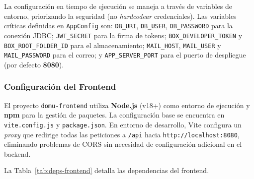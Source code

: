 La configuración en tiempo de ejecución se maneja a través de variables de entorno, priorizando la seguridad (no \textit{hardcodear} credenciales). Las variables críticas definidas en \texttt{AppConfig} son: \texttt{DB\_URI}, \texttt{DB\_USER}, \texttt{DB\_PASSWORD} para la conexión JDBC; \texttt{JWT\_SECRET} para la firma de tokens; \texttt{BOX\_DEVELOPER\_TOKEN} y \texttt{BOX\_ROOT\_FOLDER\_ID} para el almacenamiento; \texttt{MAIL\_HOST}, \texttt{MAIL\_USER} y \texttt{MAIL\_PASSWORD} para el correo; y \texttt{APP\_SERVER\_PORT} para el puerto de despliegue (por defecto \textbf{8080}).

\subsubsection*{Configuración del Frontend}
El proyecto \texttt{domu-frontend} utiliza \textbf{Node.js} (v18+) como entorno de ejecución y \textbf{npm} para la gestión de paquetes. La configuración base se encuentra en \texttt{vite.config.js} y \texttt{package.json}. En entorno de desarrollo, Vite configura un \textit{proxy} que redirige todas las peticiones a \texttt{/api} hacia \texttt{http://localhost:8080}, eliminando problemas de CORS sin necesidad de configuración adicional en el backend.

La Tabla~\ref{tab:deps-frontend} detalla las dependencias del frontend.

